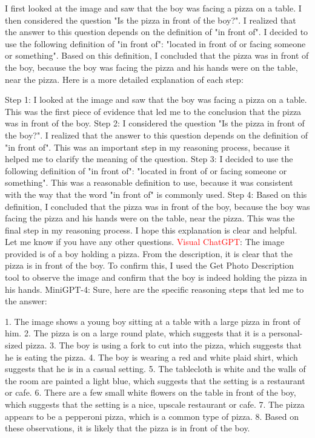 \begin{enumerate}
        I first looked at the image and saw that the boy was facing a pizza on a table.
        I then considered the question "Is the pizza in front of the boy?". I realized that the answer to this question depends on the definition of "in front of".
        I decided to use the following definition of "in front of": "located in front of or facing someone or something".
        Based on this definition, I concluded that the pizza was in front of the boy, because the boy was facing the pizza and his hands were on the table, near the pizza.
        Here is a more detailed explanation of each step:

        Step 1: I looked at the image and saw that the boy was facing a pizza on a table. This was the first piece of evidence that led me to the conclusion that the pizza was in front of the boy.
        Step 2: I considered the question "Is the pizza in front of the boy?". I realized that the answer to this question depends on the definition of "in front of". This was an important step in my reasoning process, because it helped me to clarify the meaning of the question.
        Step 3: I decided to use the following definition of "in front of": "located in front of or facing someone or something". This was a reasonable definition to use, because it was consistent with the way that the word "in front of" is commonly used.
        Step 4: Based on this definition, I concluded that the pizza was in front of the boy, because the boy was facing the pizza and his hands were on the table, near the pizza. This was the final step in my reasoning process.
        I hope this explanation is clear and helpful. Let me know if you have any other questions.
        \subitem \textcolor{red}{Visual ChatGPT}: The image provided is of a boy holding a pizza. From the description, it is clear that the pizza is in front of the boy. To confirm this, I used the Get Photo Description tool to observe the image and confirm that the boy is indeed holding the pizza in his hands.
        \subitem MiniGPT-4: Sure, here are the specific reasoning steps that led me to the answer:

        1. The image shows a young boy sitting at a table with a large pizza in front of him.
        2. The pizza is on a large round plate, which suggests that it is a personal-sized pizza.
        3. The boy is using a fork to cut into the pizza, which suggests that he is eating the pizza.
        4. The boy is wearing a red and white plaid shirt, which suggests that he is in a casual setting.
        5. The tablecloth is white and the walls of the room are painted a light blue, which suggests that the setting is a restaurant or cafe.
        6. There are a few small white flowers on the table in front of the boy, which suggests that the setting is a nice, upscale restaurant or cafe.
        7. The pizza appears to be a pepperoni pizza, which is a common type of pizza.
        8. Based on these observations, it is likely that the pizza is in front of the boy.
    \end{enumerate}
